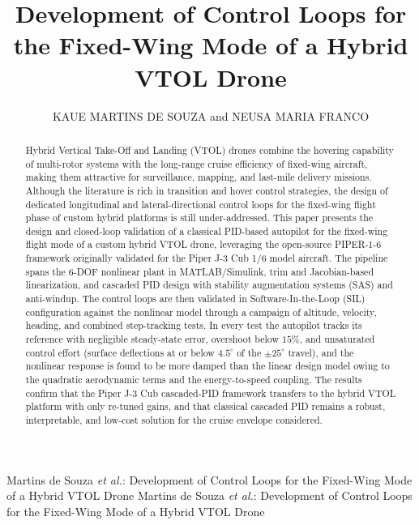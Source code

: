 \documentclass{ieeeaccess}
\begin{document}
\doi{}

\title{Development of Control Loops for the Fixed-Wing Mode of a Hybrid VTOL Drone}
\author{\uppercase{Kaue Martins de Souza} and
\uppercase{Neusa Maria Franco}}

\address[1]{Aeronautics Institute of Technology (ITA), S\~{a}o Jos\'{e} dos Campos, SP 12228-900, Brazil
(e-mail: martinskms@ita.br; neusa@ita.br)}


\markboth
{Martins de Souza \MakeLowercase{\textit{et al.}}: Development of Control Loops for the Fixed-Wing Mode of a Hybrid VTOL Drone}
{Martins de Souza \MakeLowercase{\textit{et al.}}: Development of Control Loops for the Fixed-Wing Mode of a Hybrid VTOL Drone}



\begin{abstract}
Hybrid Vertical Take-Off and Landing (VTOL) drones combine the hovering capability of multi-rotor systems with the long-range cruise efficiency of fixed-wing aircraft, making them attractive for surveillance, mapping, and last-mile delivery missions. Although the literature is rich in transition and hover control strategies, the design of dedicated longitudinal and lateral-directional control loops for the fixed-wing flight phase of custom hybrid platforms is still under-addressed. This paper presents the design and closed-loop validation of a classical PID-based autopilot for the fixed-wing flight mode of a custom hybrid VTOL drone, leveraging the open-source PIPER-1-6 framework originally validated for the Piper J-3 Cub 1/6 model aircraft. The pipeline spans the 6-DOF nonlinear plant in MATLAB/Simulink, trim and Jacobian-based linearization, and cascaded PID design with stability augmentation systems (SAS) and anti-windup. The control loops are then validated in Software-In-the-Loop (SIL) configuration against the nonlinear model through a campaign of altitude, velocity, heading, and combined step-tracking tests. In every test the autopilot tracks its reference with negligible steady-state error, overshoot below $15\%$, and unsaturated control effort (surface deflections at or below $4.5^\circ$ of the $\pm 25^\circ$ travel), and the nonlinear response is found to be more damped than the linear design model owing to the quadratic aerodynamic terms and the energy-to-speed coupling. The results confirm that the Piper J-3 Cub cascaded-PID framework transfers to the hybrid VTOL platform with only re-tuned gains, and that classical cascaded PID remains a robust, interpretable, and low-cost solution for the cruise envelope considered.
\end{abstract}
\end{document}
